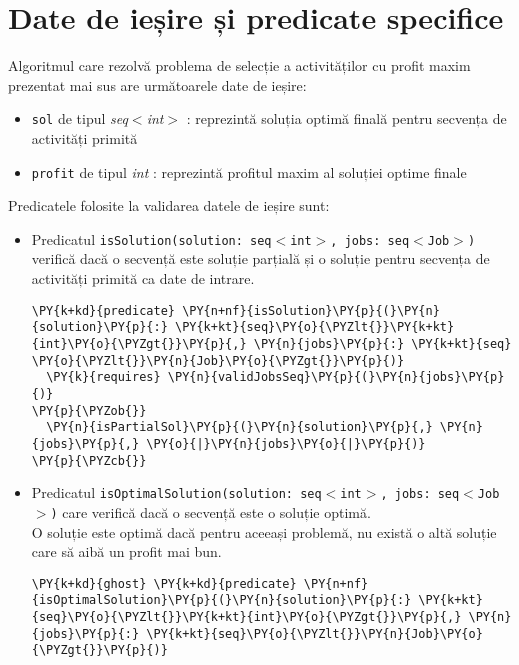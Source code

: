 \section{Date de ieșire și predicate specifice }
Algoritmul care rezolvă problema de selecție a activităților cu profit maxim prezentat mai sus are următoarele date de ieșire:
\begin{itemize}
    \item \texttt{sol} de tipul {\textit{seq$<$int$>$}} : reprezintă soluția optimă finală pentru secvența de activități primită 
    \item \texttt{profit} de tipul \textit{int} : reprezintă profitul maxim al soluției optime finale
\end{itemize}

Predicatele folosite la validarea datele de ieșire sunt:
\begin{itemize}
    \item Predicatul \texttt{isSolution(solution: seq$<$int$>$, jobs: seq$<$Job$>$)} verifică dacă o secvență este soluție parțială și o soluție pentru secvența de activități primită ca date de intrare.
    \begin{Verbatim}[commandchars=\\\{\}, fontsize=\footnotesize]
\PY{k+kd}{predicate} \PY{n+nf}{isSolution}\PY{p}{(}\PY{n}{solution}\PY{p}{:} \PY{k+kt}{seq}\PY{o}{\PYZlt{}}\PY{k+kt}{int}\PY{o}{\PYZgt{}}\PY{p}{,} \PY{n}{jobs}\PY{p}{:} \PY{k+kt}{seq} \PY{o}{\PYZlt{}}\PY{n}{Job}\PY{o}{\PYZgt{}}\PY{p}{)}
  \PY{k}{requires} \PY{n}{validJobsSeq}\PY{p}{(}\PY{n}{jobs}\PY{p}{)}
\PY{p}{\PYZob{}}
  \PY{n}{isPartialSol}\PY{p}{(}\PY{n}{solution}\PY{p}{,} \PY{n}{jobs}\PY{p}{,} \PY{o}{|}\PY{n}{jobs}\PY{o}{|}\PY{p}{)}
\PY{p}{\PYZcb{}}
\end{Verbatim}
    \item Predicatul \texttt{isOptimalSolution(solution: seq$<$int$>$, jobs: seq$<$Job$>$)} care verifică dacă o secvență este o soluție optimă.\\
    O soluție este optimă dacă pentru aceeași problemă, nu există o altă soluție care să aibă un profit mai bun.
    \begin{footnotesize}
    \begin{Verbatim}[commandchars=\\\{\}, fontsize=\footnotesize]
\PY{k+kd}{ghost} \PY{k+kd}{predicate} \PY{n+nf}{isOptimalSolution}\PY{p}{(}\PY{n}{solution}\PY{p}{:} \PY{k+kt}{seq}\PY{o}{\PYZlt{}}\PY{k+kt}{int}\PY{o}{\PYZgt{}}\PY{p}{,} \PY{n}{jobs}\PY{p}{:} \PY{k+kt}{seq}\PY{o}{\PYZlt{}}\PY{n}{Job}\PY{o}{\PYZgt{}}\PY{p}{)}

\end{Verbatim}
\end{footnotesize}
\end{itemize}
